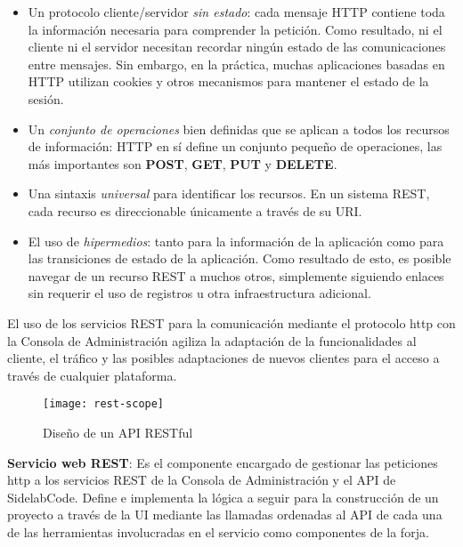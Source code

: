 \begin{itemize}
	\item Un protocolo cliente/servidor \emph{sin estado}: cada mensaje HTTP contiene toda la información necesaria para comprender la petición. Como resultado, ni el cliente ni el servidor necesitan recordar ningún estado de las comunicaciones entre mensajes. Sin embargo, en la práctica, muchas aplicaciones basadas en HTTP utilizan cookies y otros mecanismos para mantener el estado de la sesión.

	\item Un \emph{conjunto de operaciones} bien definidas que se aplican a todos los recursos de información: HTTP en sí define un conjunto pequeño de operaciones, las más importantes son \textbf{POST}, \textbf{GET}, \textbf{PUT} y \textbf{DELETE}.

	\item Una sintaxis \emph{universal} para identificar los recursos. En un sistema REST, cada recurso es direccionable únicamente a través de su URI.

	\item El uso de \emph{hipermedios}: tanto para la información de la aplicación como para las transiciones de estado de la aplicación. Como resultado de esto, es posible navegar de un recurso REST a muchos otros, simplemente siguiendo enlaces sin requerir el uso de registros u otra infraestructura adicional.
\end{itemize}

\par El uso de los servicios REST para la comunicación mediante el protocolo http con la Consola de Administración agiliza la adaptación de la funcionalidades al cliente, el tráfico y las posibles adaptaciones de nuevos clientes para el acceso a través de cualquier plataforma.

\begin{figure}[H]
    \centering
    \texttt{[image: rest-scope]}
    \caption{Diseño de un API RESTful}
    \label{fig:rest-scope}
\end{figure}

\par \textbf{Servicio web REST}: Es el componente encargado de gestionar las peticiones http a los servicios REST de la Consola de Administración y el API de SidelabCode. Define e implementa la lógica a seguir para la construcción de un proyecto a través de la UI mediante las llamadas ordenadas al API de cada una de las herramientas involucradas en el servicio como componentes de la forja.

